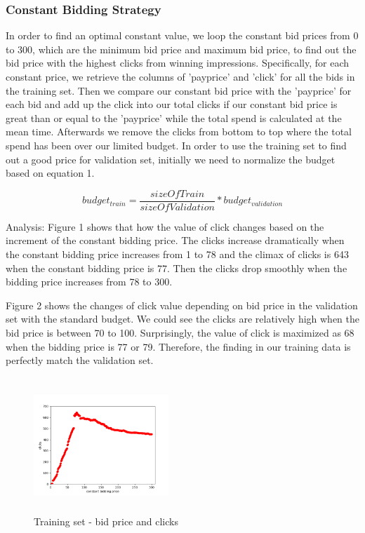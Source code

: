 \documentclass{sig-alternate-05-2015}
\begin{document}
\subsubsection{Constant Bidding Strategy}
In order to find an optimal constant value, we loop the constant bid prices from 0 to 300, which are the minimum bid price and maximum bid price, to find out the bid price with the highest clicks from winning impressions. Specifically, for each constant price, we retrieve the columns of 'payprice' and 'click' for all the bids in the training set. Then we compare our constant bid price with the 'payprice' for each bid and add up the click into our total clicks if our constant bid price is great than or equal to the 'payprice' while the total spend is calculated at the mean time. Afterwards we remove the clicks from bottom to top where the total spend has been over our limited budget.
In order to use the training set to find out a good price for validation set, initially we need to normalize the budget based on equation 1.

\begin{equation}budget_{train}=\frac{sizeOfTrain}{sizeOfValidation} * budget_{validation}\end{equation}

Analysis: 
Figure 1 shows that how the value of click changes based on the increment of the constant bidding price. The clicks increase dramatically when the constant bidding price increases from 1 to 78 and the climax of clicks is 643 when the constant bidding price is 77. Then the clicks drop smoothly when the bidding price increases from 78 to 300.


Figure 2 shows the changes of click value depending on bid price in the validation set with the standard budget. We could see the clicks are relatively high when the bid price is between 70 to 100. Surprisingly, the value of click is maximized as 68 when the bidding price is 77 or 79. Therefore, the finding in our training data is perfectly match the validation set.

\begin{figure}
\centering
\includegraphics[height=2in, width=2in]{images/constant_bidding.png}
\caption{Training set - bid price and clicks}
\end{figure}
\end{document}
